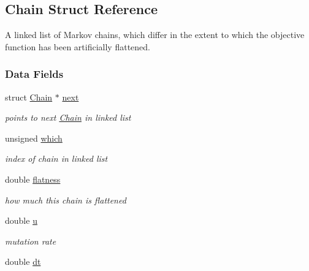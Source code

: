 \hypertarget{struct_chain}{\subsection{\-Chain \-Struct \-Reference}
\label{struct_chain}
}


\-A linked list of \-Markov chains, which differ in the extent to which the objective function has been artificially flattened.  


\subsubsection*{\-Data \-Fields}
\begin{DoxyCompactItemize}
\item 
\hypertarget{struct_chain_a4a72dbd38d8d5ace36a3f9228bef05e6}{struct \hyperlink{struct_chain}{\-Chain} $\ast$ \hyperlink{struct_chain_a4a72dbd38d8d5ace36a3f9228bef05e6}{next}}\label{struct_chain_a4a72dbd38d8d5ace36a3f9228bef05e6}

\begin{DoxyCompactList}\small\item\em points to next \hyperlink{struct_chain}{\-Chain} in linked list \end{DoxyCompactList}\item 
\hypertarget{struct_chain_acf3931e85fd873f46d72ef82de52b1fd}{unsigned \hyperlink{struct_chain_acf3931e85fd873f46d72ef82de52b1fd}{which}}\label{struct_chain_acf3931e85fd873f46d72ef82de52b1fd}

\begin{DoxyCompactList}\small\item\em index of chain in linked list \end{DoxyCompactList}\item 
\hypertarget{struct_chain_a900345372482091304b3a1721577369a}{double \hyperlink{struct_chain_a900345372482091304b3a1721577369a}{flatness}}\label{struct_chain_a900345372482091304b3a1721577369a}

\begin{DoxyCompactList}\small\item\em how much this chain is flattened \end{DoxyCompactList}\item 
\hypertarget{struct_chain_a98e9043526075232bfe24aac37119f6a}{double \hyperlink{struct_chain_a98e9043526075232bfe24aac37119f6a}{u}}\label{struct_chain_a98e9043526075232bfe24aac37119f6a}

\begin{DoxyCompactList}\small\item\em mutation rate \end{DoxyCompactList}\item 
\hypertarget{struct_chain_a392fb5e9e408b49f008524cb7eabc8b0}{double \hyperlink{struct_chain_a392fb5e9e408b49f008524cb7eabc8b0}{dt}}\label{struct_chain_a392fb5e9e408b49f008524cb7eabc8b0}


\end{DoxyCompactItemize}
